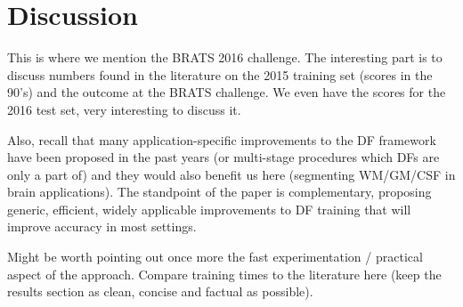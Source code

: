 
\section{Discussion}
\label{sec:discuss}


This is where we mention the BRATS 2016 challenge. The interesting part is to discuss numbers found in the literature on the 2015 training set (scores in the 90's) and the outcome at the BRATS challenge. We even have the scores for the 2016 test set, very interesting to discuss it.

Also, recall that many application-specific improvements to the DF framework have been proposed in the past years (or multi-stage procedures which DFs are only a part of) and they would also benefit us here (\eg segmenting WM/GM/CSF in brain applications). The standpoint of the paper is complementary, proposing generic, efficient, widely applicable improvements to DF training that will improve accuracy in most settings.

Might be worth pointing out once more the fast experimentation / practical aspect of the approach. Compare training times to the literature here (keep the results section as clean, concise and factual as possible). 